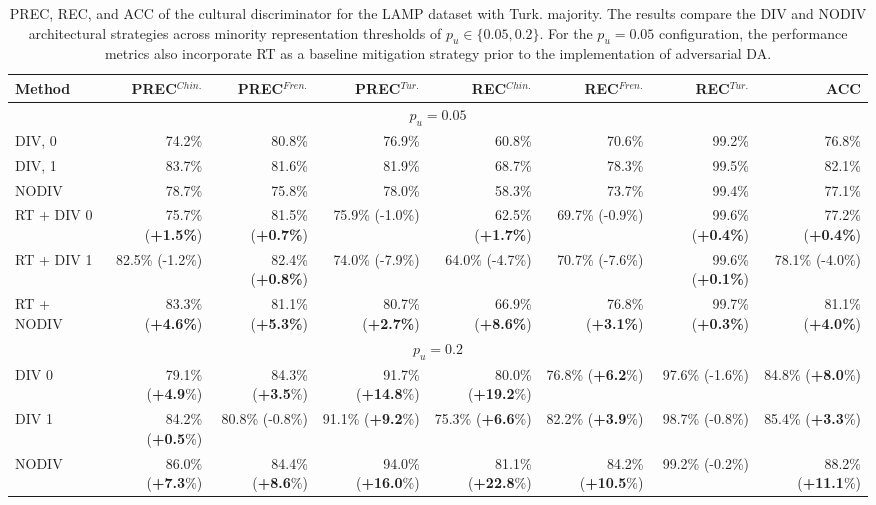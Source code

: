 \begin{table}
\centering
\scriptsize
\setlength{\tabcolsep}{0.1cm}
\begin{tabular}{lrrrrrrr}
\toprule
\textbf{Method} & \textbf{PREC}$^{Chin.}$  & \textbf{PREC}$^{Fren.}$ & \textbf{PREC}$^{Tur.}$ & \textbf{REC}$^{Chin.}$ & \textbf{REC}$^{Fren.}$ & \textbf{REC}$^{Tur.}$ &  \textbf{ACC}\\
\midrule
\multicolumn{8}{c}{$p_u=0.05$} \\
\midrule
DIV, 0 & 74.2\%&	80.8\%&	76.9\%	&	60.8\%	&	70.6\%	&	99.2\%	&	76.8\%	\\
DIV, 1 & 83.7\%	&	81.6\%&	81.9\%	&	68.7\%	&	78.3\%	&	99.5\%&	82.1\%	\\
NODIV & 78.7\%	&	75.8\%&	78.0\%&	58.3\%&	73.7\%&	99.4\%&	77.1\%\\
\midrule
RT + DIV 0      & 75.7\% (\textbf{+1.5\%}) & 81.5\% (\textbf{+0.7\%}) & 75.9\% (-1.0\%) & 62.5\% (\textbf{+1.7\%}) & 69.7\% (-0.9\%) & 99.6\% (\textbf{+0.4\%}) & 77.2\% (\textbf{+0.4\%}) \\
RT + DIV 1      & 82.5\% (-1.2\%) & 82.4\% (\textbf{+0.8\%}) & 74.0\% (-7.9\%) & 64.0\% (-4.7\%) & 70.7\% (-7.6\%) & 99.6\% (\textbf{+0.1\%}) & 78.1\% (-4.0\%) \\
RT + NODIV      & 83.3\% (\textbf{+4.6\%}) & 81.1\% (\textbf{+5.3\%}) & 80.7\% (\textbf{+2.7\%}) & 66.9\% (\textbf{+8.6\%}) & 76.8\% (\textbf{+3.1\%}) & 99.7\% (\textbf{+0.3\%}) & 81.1\% (\textbf{+4.0\%}) \\
\midrule
\multicolumn{8}{c}{$p_u=0.2$} \\
\midrule
DIV 0           & 79.1\% (\textbf{+4.9}\%) & 84.3\% (\textbf{+3.5}\%) & 91.7\% (\textbf{+14.8}\%) & 80.0\% (\textbf{+19.2}\%) & 76.8\% (\textbf{+6.2}\%) & 97.6\% (-1.6\%) & 84.8\% (\textbf{+8.0}\%) \\
DIV 1           & 84.2\% (\textbf{+0.5}\%) & 80.8\% (-0.8\%) & 91.1\% (\textbf{+9.2}\%) & 75.3\% (\textbf{+6.6}\%) & 82.2\% (\textbf{+3.9}\%) & 98.7\% (-0.8\%) & 85.4\% (\textbf{+3.3}\%) \\
NODIV           & 86.0\% (\textbf{+7.3}\%) & 84.4\% (\textbf{+8.6}\%) & 94.0\% (\textbf{+16.0}\%) & 81.1\% (\textbf{+22.8}\%) & 84.2\% (\textbf{+10.5}\%) & 99.2\% (-0.2\%) & 88.2\% (\textbf{+11.1}\%) \\
\bottomrule
\end{tabular}
\caption{PREC, REC, and ACC of the cultural discriminator for the LAMP dataset with Turk. majority. The results compare the DIV and NODIV architectural strategies across minority representation thresholds of $p_u \in \{0.05, 0.2\}$. For the $p_u = 0.05$ configuration, the performance metrics also incorporate RT as a baseline mitigation strategy prior to the implementation of adversarial DA.}
\label{ch3:tab:discr:LT}
\end{table}
